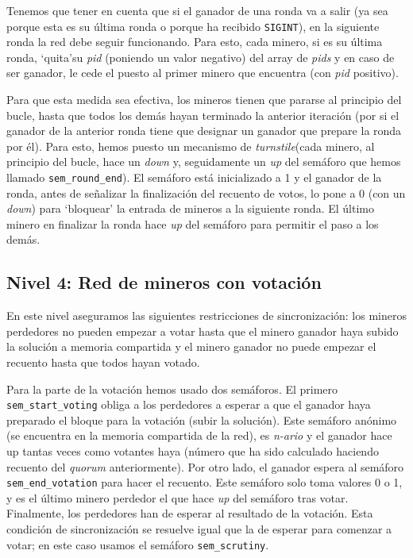 \documentclass{article}
\begin{document}
Tenemos que tener en cuenta que si el ganador de una ronda  va a salir (ya sea porque esta es su última ronda o porque ha recibido \texttt{SIGINT}), en la siguiente ronda la red debe seguir funcionando. Para esto, cada minero, si es su última ronda, `quita'\footnotemark su \textit{pid} (poniendo un valor negativo) del array de \textit{pids} y en caso de ser ganador, le cede el puesto al primer minero que encuentra (con \emph{pid} positivo).


Para que esta medida sea efectiva, los mineros tienen que pararse al principio del bucle, hasta que todos los demás hayan terminado la anterior iteración (por si el ganador de la anterior ronda tiene que designar un ganador que prepare la ronda por él). Para esto, hemos puesto un mecanismo de \textit{turnstile}\footnotemark (cada minero, al principio del bucle, hace un \textit{down} y, seguidamente un \textit{up} del semáforo que hemos llamado \texttt{sem\_round\_end}). El semáforo está inicializado a 1 y el ganador de la ronda, antes de señalizar la finalización del recuento de votos, lo pone a 0 (con un \textit{down}) para `bloquear' la entrada
de mineros a la siguiente ronda. El último minero en finalizar la ronda hace \textit{up} del semáforo para permitir el paso a los demás.


\subsection*{Nivel 4: Red de mineros con votación}

En este nivel aseguramos  las siguientes restricciones de sincronización: los mineros perdedores no pueden empezar a votar hasta que el minero ganador haya subido la solución a memoria compartida y el minero ganador no puede empezar el recuento hasta que todos hayan votado.

Para la parte de la votación hemos usado dos semáforos. El primero \texttt{sem\_start\_voting} obliga a los perdedores a esperar a que el ganador haya preparado el bloque para la votación (subir la solución). Este semáforo anónimo (se encuentra en la memoria compartida de la red), es \textit{n-ario} y el ganador hace up tantas veces como votantes haya (número que ha sido calculado haciendo  recuento del \textit{quorum} anteriormente). Por otro lado, el ganador espera al semáforo \texttt{sem\_end\_votation} para hacer el recuento. Este semáforo solo toma valores 0 o 1, y es el último minero perdedor el que hace \emph{up} del semáforo tras votar. Finalmente, los perdedores han de esperar al resultado de la votación. Esta condición de sincronización se resuelve igual que la de esperar para comenzar a votar; en este caso usamos el semáforo \texttt{sem\_scrutiny}.
\end{document}
